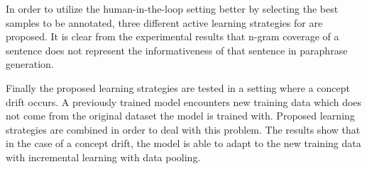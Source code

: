 In order to utilize the human-in-the-loop setting better by selecting the best samples to be annotated, three different active learning strategies for are proposed. It is clear from the experimental results that n-gram coverage of a sentence does not represent the informativeness of that sentence in paraphrase generation.

Finally the proposed learning strategies are tested in a setting where a concept drift occurs. A previously trained model encounters new training data which does not come from the original dataset the model is trained with. Proposed learning strategies are combined in order to deal with this problem. The results show that in the case of a concept drift, the model is able to adapt to the new training data with incremental learning with data pooling. 

